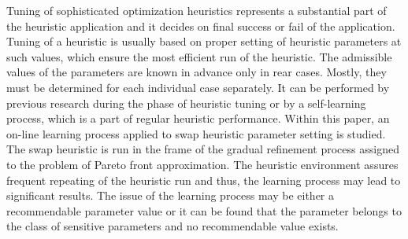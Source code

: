 
\begin{Abstrakt}
    Tuning of sophisticated optimization heuristics represents a substantial part of the heuristic application and it decides on final success or fail of the application. Tuning of a heuristic is usually based on proper setting of heuristic parameters at such values, which ensure the most efficient run of the heuristic. The admissible values of the parameters are known in advance only in rear cases. Mostly, they must be determined for each individual case separately. It can be performed by previous research during the phase of heuristic tuning or by a self-learning process, which is a part of regular heuristic performance. Within this paper, an on-line learning process applied to swap heuristic parameter setting is studied. The swap heuristic is run in the frame of the gradual refinement process assigned to the problem of Pareto front approximation. The heuristic environment assures frequent repeating of the heuristic run and thus, the learning process may lead to significant results. The issue of the learning process may be either a recommendable parameter value or it can be found that the parameter belongs to the class of sensitive parameters and no recommendable value exists.
\end{Abstrakt}



\clearpage